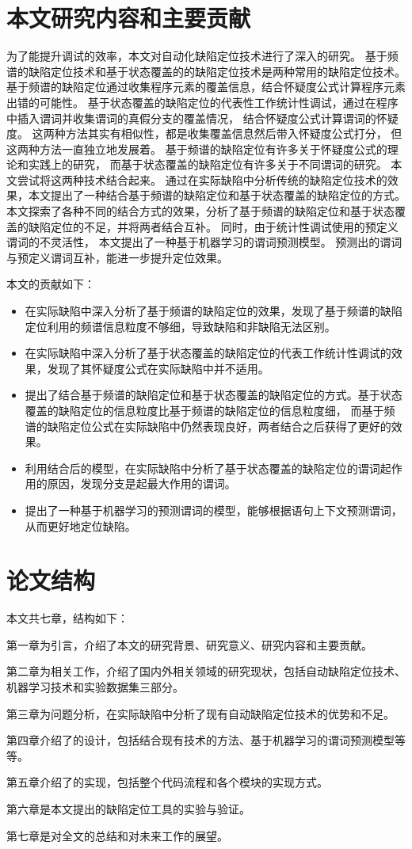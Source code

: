 \section{本文研究内容和主要贡献}

为了能提升调试的效率，本文对自动化缺陷定位技术进行了深入的研究。
基于频谱的缺陷定位技术和基于状态覆盖的的缺陷定位技术是两种常用的缺陷定位技术。
基于频谱的缺陷定位通过收集程序元素的覆盖信息，结合怀疑度公式计算程序元素出错的可能性。
基于状态覆盖的缺陷定位的代表性工作统计性调试，通过在程序中插入谓词并收集谓词的真假分支的覆盖情况，
结合怀疑度公式计算谓词的怀疑度。
这两种方法其实有相似性，都是收集覆盖信息然后带入怀疑度公式打分，
但这两种方法一直独立地发展着。
基于频谱的缺陷定位有许多关于怀疑度公式的理论和实践上的研究，
而基于状态覆盖的缺陷定位有许多关于不同谓词的研究。
本文尝试将这两种技术结合起来。
通过在实际缺陷中分析传统的缺陷定位技术的效果，本文提出了一种结合基于频谱的缺陷定位和基于状态覆盖的缺陷定位的方式。
本文探索了各种不同的结合方式的效果，分析了基于频谱的缺陷定位和基于状态覆盖的缺陷定位的不足，并将两者结合互补。
同时，由于统计性调试使用的预定义谓词的不灵活性，
本文提出了一种基于机器学习的谓词预测模型。
预测出的谓词与预定义谓词互补，能进一步提升定位效果。

本文的贡献如下：
\begin{itemize}
\item 在实际缺陷中深入分析了基于频谱的缺陷定位的效果，发现了基于频谱的缺陷定位利用的频谱信息粒度不够细，导致缺陷和非缺陷无法区别。
\item 在实际缺陷中深入分析了基于状态覆盖的缺陷定位的代表工作统计性调试的效果，发现了其怀疑度公式在实际缺陷中并不适用。
\item 提出了结合基于频谱的缺陷定位和基于状态覆盖的缺陷定位的方式。基于状态覆盖的缺陷定位的信息粒度比基于频谱的缺陷定位的信息粒度细，
而基于频谱的缺陷定位公式在实际缺陷中仍然表现良好，两者结合之后获得了更好的效果。
\item 利用结合后的模型，在实际缺陷中分析了基于状态覆盖的缺陷定位的谓词起作用的原因，发现分支是起最大作用的谓词。
\item 提出了一种基于机器学习的预测谓词的模型，能够根据语句上下文预测谓词，从而更好地定位缺陷。
\end{itemize}

\section{论文结构}

本文共七章，结构如下：

第一章为引言，介绍了本文的研究背景、研究意义、研究内容和主要贡献。

第二章为相关工作，介绍了国内外相关领域的研究现状，包括自动缺陷定位技术、机器学习技术和实验数据集三部分。

第三章为问题分析，在实际缺陷中分析了现有自动缺陷定位技术的优势和不足。

第四章介绍了\toolname{}的设计，包括结合现有技术的方法、基于机器学习的谓词预测模型等等。

第五章介绍了\toolname{}的实现，包括整个代码流程和各个模块的实现方式。

第六章是本文提出的缺陷定位工具的实验与验证。

第七章是对全文的总结和对未来工作的展望。

